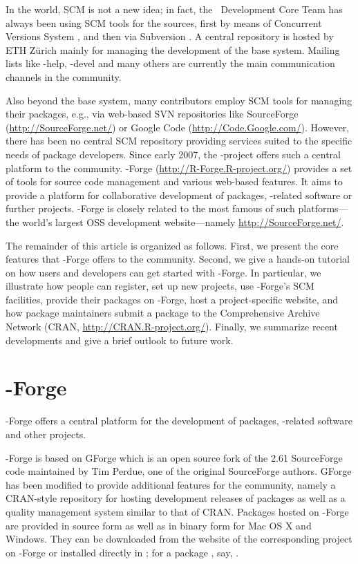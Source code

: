 In the \R{} world, SCM is not a new idea; in fact, the \R{}~Development
Core Team has always been using SCM tools for the \R{} sources, first by means of
Concurrent Versions System \citep[CVS, see][]{forge:Cederqvist:2006},
and then via Subversion \citep[SVN, see][]{forge:Pilato+Collins-Sussman+Fitzpatrick:2004}.
A central repository is hosted by ETH Z\"urich mainly for
managing the development of the base \R{} system. Mailing lists like
\R{}-help, \R{}-devel and many others are currently the main communication
channels in the \R{} community.

Also beyond the base system, many \R{} contributors employ
SCM tools for managing their \R{} packages, e.g., via web-based
SVN repositories like SourceForge (\url{http://SourceForge.net/})
or Google Code (\url{http://Code.Google.com/}). However, there has been
no central SCM repository providing services suited to the specific
needs of \R{} package developers.
Since early 2007, the \R{}-project offers such a central platform to the \R{}
community. \R{}-Forge (\url{http://R-Forge.R-project.org/}) provides a set
of tools for source code management and various web-based
features. It aims to provide a platform for collaborative development of
\R{} packages, \R{}-related software or further projects. \R{}-Forge is
closely related to the most famous of such platforms---the
world's largest OSS development website---namely
\url{http://SourceForge.net/}.

The remainder of this article is organized as follows. First, we
present the core
features that \R{}-Forge offers to the \R{} community. Second, we
give a hands-on tutorial on how users and developers can get started with
\R{}-Forge. In particular, we illustrate how people
can register, set up new projects, use \R{}-Forge's SCM
facilities, provide their packages on \R{}-Forge, host a
project-specific website, and 
how package maintainers submit a package to the Comprehensive \R{}
Archive Network (CRAN, \url{http://CRAN.R-project.org/}).
Finally, we summarize recent developments and give a brief outlook
to future work.


\section{\R{}-Forge}
\R{}-Forge offers a central platform for the development of \R{}
packages, \R{}-related software and other projects.

\R{}-Forge is based on GForge \citep{forge:copeland_et_al:2006} which is
an open source fork of the 2.61 SourceForge code maintained by Tim
Perdue, one of the original SourceForge authors. GForge has been
modified to provide additional features for the \R{} community, namely
a CRAN-style repository for hosting development releases of \R{}
packages as well as a quality management system similar to that of
CRAN.
Packages hosted on \R{}-Forge are provided in source form as well as
in binary form for Mac OS X and Windows. They can be downloaded from the
website of the corresponding project on \R{}-Forge or installed
directly in \R{}; for a package , say,
.

